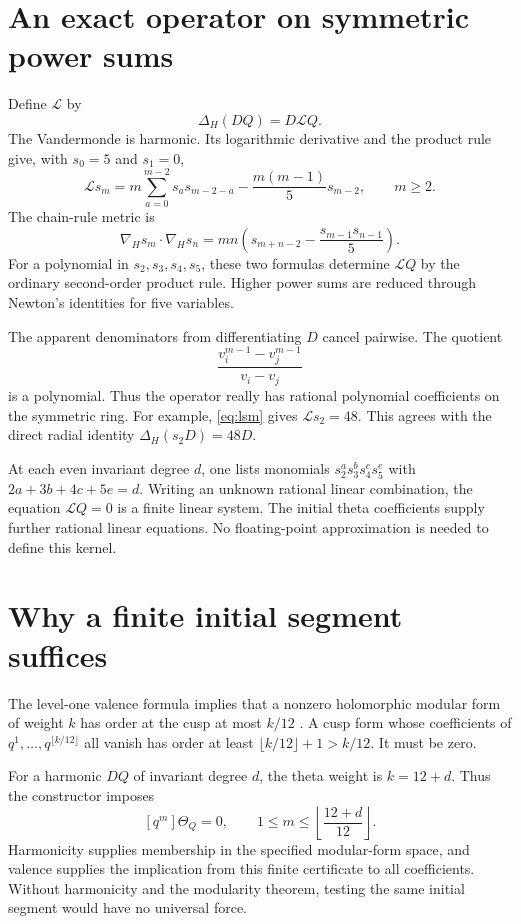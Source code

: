 \section{An exact operator on symmetric power sums}
Define $\mathcal L$ by
\[
\Delta_H(DQ)=D\mathcal LQ.
\]
The Vandermonde is harmonic. Its logarithmic derivative and the product rule give, with $s_0=5$ and $s_1=0$,
\begin{equation}\label{eq:lsm}
\mathcal Ls_m
=m\sum_{a=0}^{m-2}s_as_{m-2-a}
-\frac{m(m-1)}5s_{m-2},\qquad m\ge2.
\end{equation}
The chain-rule metric is
\begin{equation}\label{eq:gradient}
\nabla_Hs_m\cdot\nabla_Hs_n
=mn\left(s_{m+n-2}-\frac{s_{m-1}s_{n-1}}5\right).
\end{equation}
For a polynomial in $s_2,s_3,s_4,s_5$, these two formulas determine $\mathcal LQ$ by the ordinary second-order product rule. Higher power sums are reduced through Newton's identities for five variables.

The apparent denominators from differentiating $D$ cancel pairwise. The quotient
\[
\frac{v_i^{m-1}-v_j^{m-1}}{v_i-v_j}
\]
is a polynomial. Thus the operator really has rational polynomial coefficients on the symmetric ring. For example, \eqref{eq:lsm} gives $\mathcal Ls_2=48$. This agrees with the direct radial identity $\Delta_H(s_2D)=48D$.

At each even invariant degree $d$, one lists monomials $s_2^as_3^bs_4^cs_5^e$ with $2a+3b+4c+5e=d$. Writing an unknown rational linear combination, the equation $\mathcal LQ=0$ is a finite linear system. The initial theta coefficients supply further rational linear equations. No floating-point approximation is needed to define this kernel.

\section{Why a finite initial segment suffices}
The level-one valence formula implies that a nonzero holomorphic modular form of weight $k$ has order at the cusp at most $k/12$ \cite{Stein}. A cusp form whose coefficients of $q^1,\ldots,q^{\lfloor k/12\rfloor}$ all vanish has order at least $\lfloor k/12\rfloor+1>k/12$. It must be zero.

For a harmonic $DQ$ of invariant degree $d$, the theta weight is $k=12+d$. Thus the constructor imposes
\[
[q^m]\Theta_Q=0,\qquad1\le m\le\left\lfloor\frac{12+d}{12}\right\rfloor.
\]
Harmonicity supplies membership in the specified modular-form space, and valence supplies the implication from this finite certificate to all coefficients. Without harmonicity and the modularity theorem, testing the same initial segment would have no universal force.

